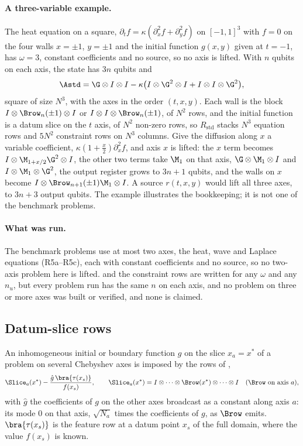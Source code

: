 \paragraph{A three-variable example.} The heat equation on a square, $\partial_tf=\kappa(\partial_x^2f+\partial_y^2f)$ on $[-1,1]^3$ with $f=0$ on the four walls $x=\pm1$, $y=\pm1$ and the initial function $g(x,y)$ given at $t=-1$, has $\omega=3$, constant coefficients and no source, so no axis is lifted. With $n$ qubits on each axis, the state has $3n$ qubits and
\begin{equation*}
    \Astd=\G\otimes I\otimes I-\kappa\bigl(I\otimes\G^2\otimes I+I\otimes I\otimes\G^2\bigr),
\end{equation*}
square of size $N^3$, with the axes in the order $(t,x,y)$. Each wall is the block $I\otimes\Brow_n(\pm1)\otimes I$ or $I\otimes I\otimes\Brow_n(\pm1)$, of $N^2$ rows, and the initial function is a datum slice on the $t$ axis, of $N^2$ non-zero rows, so $R_{\mathrm{std}}$ stacks $N^3$ equation rows and $5N^2$ constraint rows on $N^3$ columns. Give the diffusion along $x$ a variable coefficient, $\kappa(1+\tfrac x2)\partial_x^2f$, and axis $x$ is lifted: the $x$ term becomes $I\otimes\M_{1+x/2}\G^2\otimes I$, the other two terms take $\M_1$ on that axis, $\G\otimes\M_1\otimes I$ and $I\otimes\M_1\otimes\G^2$, the output register grows to $3n+1$ qubits, and the walls on $x$ become $I\otimes\Brow_{n+1}(\pm1)\M_1\otimes I$. A source $r(t,x,y)$ would lift all three axes, to $3n+3$ output qubits. The example illustrates the bookkeeping; it is not one of the benchmark problems.

\paragraph{What was run.} The benchmark problems use at most two axes, the heat, wave and Laplace equations (R5a--R5c), each with constant coefficients and no source, so no two-axis problem here is lifted.  and the constraint rows are written for any $\omega$ and any $n_u$, but every problem run has the same $n$ on each axis, and no problem on three or more axes was built or verified, and none is claimed.

\subsection{Datum-slice rows}
\label{app:datum-slice}

An inhomogeneous initial or boundary function $g$ on the slice $x_a=x^*$ of a problem on several Chebyshev axes is imposed by the rows of ,
\begin{equation*}
    \Slice_a(x^*)-\frac{\hat g\,\bra{\tau(x_s)}}{f(x_s)}, \qquad \Slice_a(x^*)=I\otimes\dots\otimes\Brow(x^*)\otimes\dots\otimes I\quad(\Brow \text{ on axis } a),
\end{equation*}
with $\hat g$ the coefficients of $g$ on the other axes broadcast as a constant along axis $a$: its mode $0$ on that axis, $\sqrt{N_a}$ times the coefficients of $g$, as $\Brow$ emits. $\bra{\tau(x_s)}$ is the feature row at a datum point $x_s$ of the full domain, where the value $f(x_s)$ is known.

